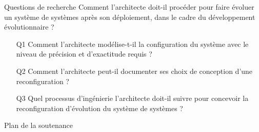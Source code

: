 
\begin{frame}{Questions de recherche}
Comment l’architecte doit-il procéder pour faire évoluer un système de systèmes après son déploiement, dans le cadre du développement évolutionnaire ?\\
\begin{itemize}
    \item[Q1] Comment l’architecte modélise-t-il la configuration du système avec le niveau de précision et d’exactitude requis ?
    \item[Q2] Comment l’architecte peut-il documenter ses choix de conception d’une reconfiguration ?
    \item[Q3] Quel processus d’ingénierie l’architecte doit-il suivre pour concevoir la reconfiguration d’évolution du système de systèmes ?
\end{itemize}
\end{frame}

\begin{frame}{Plan de la soutenance}
\tableofcontents
\end{frame}

